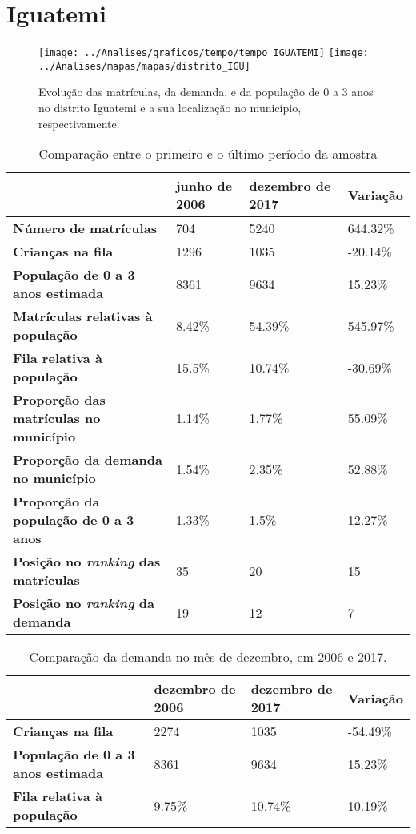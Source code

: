 \section{Iguatemi}
\begin{figure}[H]
	\centering
	\texttt{[image: ../Analises/graficos/tempo/tempo\_IGUATEMI]}
	\texttt{[image: ../Analises/mapas/mapas/distrito\_IGU]}
	\caption{Evolução das matrículas, da demanda, e da população de 0 a 3 anos no distrito Iguatemi e a sua localização no município, respectivamente.}
\end{figure}
\begin{table}[H]
	\begin{tabular}{|l|l|l|l|}
		\hline
		\textbf{}                                      & \textbf{junho de 2006}       & \textbf{dezembro de 2017}    & \textbf{Variação} \\ \hline
		\textbf{Número de matrículas}                  & 704 & 5240 & 644.32\% \\ \hline
		\textbf{Crianças na fila}                      & 1296 & 1035 & -20.14\% \\ \hline
		\textbf{População de 0 a 3 anos estimada}      & 8361 & 9634 & 15.23\% \\ \hline
		\textbf{Matrículas relativas à população}      & 8.42\% & 54.39\% & 545.97\% \\ \hline
		\textbf{Fila relativa à população}             & 15.5\% & 10.74\% & -30.69\% \\ \hline
		\textbf{Proporção das matrículas no município} & 1.14\% & 1.77\% & 55.09\% \\ \hline
		\textbf{Proporção da demanda no município}     & 1.54\% & 2.35\% & 52.88\% \\ \hline
		\textbf{Proporção da população de 0 a 3 anos}  & 1.33\% & 1.5\% & 12.27\% \\ \hline
		\textbf{Posição no \textit{ranking} das matrículas}     & 35 & 20 & 15 \\ \hline
		\textbf{Posição no \textit{ranking} da demanda}         & 19 & 12 & 7 \\ \hline
	\end{tabular}
	\caption{Comparação entre o primeiro e o último período da amostra}
\end{table}
\begin{table}[H]
	\begin{tabular}{|l|l|l|l|}
		\hline
		\textbf{}                                 & \textbf{dezembro de 2006} & \textbf{dezembro de 2017} & \textbf{Variação} \\ \hline
		\textbf{Crianças na fila}                      & 2274 & 1035 & -54.49\% \\ \hline
		\textbf{População de 0 a 3 anos estimada}      & 8361 & 9634 & 15.23\% \\ \hline
		\textbf{Fila relativa à população}             & 9.75\% & 10.74\% & 10.19\% \\ \hline
	\end{tabular}
	\caption{Comparação da demanda no mês de dezembro, em 2006 e 2017.}
\end{table}
